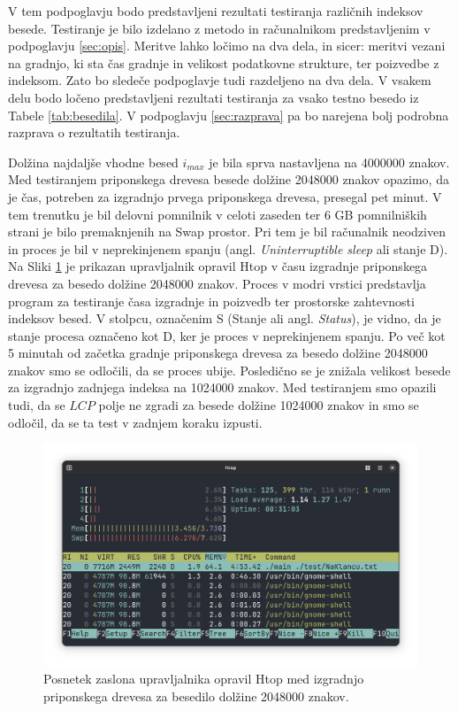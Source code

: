 V tem podpoglavju bodo predstavljeni rezultati testiranja različnih indeksov besede. Testiranje je bilo izdelano z metodo in računalnikom predstavljenim v podpoglavju \ref{sec:opis}. Meritve lahko ločimo na dva dela, in sicer: meritvi vezani na gradnjo, ki sta čas gradnje in velikost podatkovne strukture, ter poizvedbe z indeksom. Zato bo sledeče podpoglavje tudi razdeljeno na dva dela. V vsakem delu bodo ločeno predstavljeni rezultati testiranja za vsako testno besedo iz Tabele \ref{tab:besedila}. V podpoglavju \ref{sec:razprava} pa bo narejena bolj podrobna razprava o rezultatih testiranja.

Dolžina najdaljše vhodne besed $i_{max}$ je bila sprva nastavljena na 4000000 znakov. Med testiranjem priponskega drevesa besede dolžine 2048000 znakov opazimo, da je čas, potreben za izgradnjo prvega priponskega drevesa, presegal pet minut. V tem trenutku je bil delovni pomnilnik v celoti zaseden ter 6 GB pomnilniških strani je bilo premaknjenih na Swap prostor. Pri tem je bil računalnik neodziven in proces je bil v neprekinjenem spanju (angl. \textit{Uninterruptible sleep} ali stanje D). Na Sliki \ref{fig:6GB} je prikazan upravljalnik opravil Htop v času izgradnje priponskega drevesa za besedo dolžine 2048000 znakov. Proces v modri vrstici predstavlja program za testiranje časa izgradnje in poizvedb ter prostorske zahtevnosti indeksov besed. V stolpcu, označenim S (Stanje ali angl. \textit{Status}), je vidno, da je stanje procesa označeno kot D, ker je proces v neprekinjenem spanju. Po več kot 5 minutah od začetka gradnje priponskega drevesa za besedo dolžine 2048000 znakov smo se odločili, da se proces ubije. Posledično se je znižala velikost besede za izgradnjo zadnjega indeksa na 1024000 znakov. Med testiranjem smo opazili tudi, da se $LCP$ polje ne zgradi za besede dolžine 1024000 znakov in smo se odločil, da se ta test v zadnjem koraku izpusti.

\begin{figure}[tb]
    \centering
    \includegraphics[width=\textwidth]{Slike/Zaslonski posnetek 2025-06-23 22-53-56.png}

    \caption{Posnetek zaslona upravljalnika opravil Htop med izgradnjo priponskega drevesa za besedilo dolžine 2048000 znakov.} 
    \label{fig:6GB}
\end{figure}


